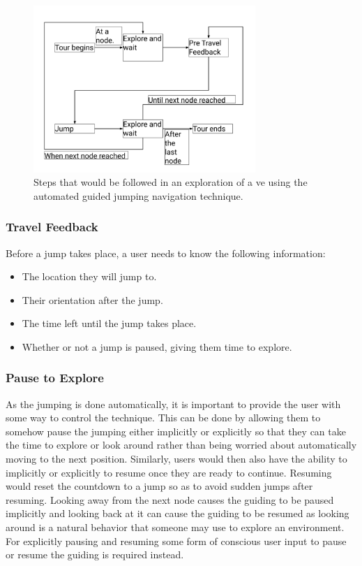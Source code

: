 \begin{figure}[]
	\centering
	\includegraphics[width=0.75\textwidth]{images/interaction-design-steps.pdf}
	\caption{Steps that would be followed in an exploration of a \acrshort{ve} using the automated guided jumping navigation technique.}
	\label{fig:interaction-design-steps}
\end{figure}

\subsubsection{Travel Feedback}
\label{subsubsection AGJ ID ES: Travel Feedback}
Before a jump takes place, a user needs to know the following information:
\begin{itemize}
	\item The location they will jump to.
	\item Their orientation after the jump.
	\item The time left until the jump takes place.
	\item Whether or not a jump is paused, giving them time to explore.
\end{itemize}

\subsubsection{Pause to Explore}
\label{subsubsection AGJ ID ES: Pause to Explore}
As the jumping is done automatically, it is important to provide the user with some way to control the technique. This can be done by allowing them to somehow pause the jumping either implicitly or explicitly so that they can take the time to explore or look around rather than being worried about automatically moving to the next position. Similarly, users would then also have the ability to implicitly or explicitly to resume once they are ready to continue. Resuming would reset the countdown to a jump so as to avoid sudden jumps after resuming. Looking away from the next node causes the guiding to be paused implicitly and looking back at it can cause the guiding to be resumed as looking around is a natural behavior that someone may use to explore an environment. For explicitly pausing and resuming some form of conscious user input to pause or resume the guiding is required instead.  

